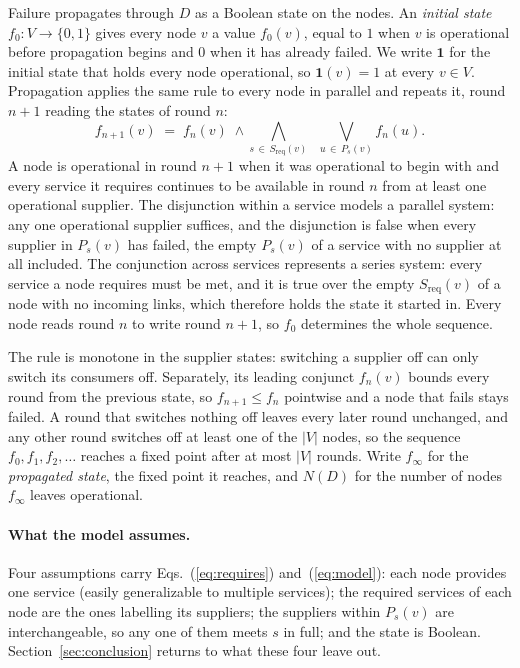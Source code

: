 \documentclass{svproc}
\begin{document}
Failure propagates through $D$ as a Boolean state on the nodes. An
\emph{initial state} $f_0 : V \to \{0,1\}$ gives every node $v$ a value $f_0(v)$,
equal to $1$ when $v$ is operational before propagation begins and $0$ when it has
already failed. We write $\mathbf{1}$ for the initial state that holds every node
operational, so $\mathbf{1}(v) = 1$ at every $v \in V$.
Propagation applies the same rule to every node in parallel and repeats it, round
$n+1$ reading the states of round $n$:
\begin{equation}
f_{n+1}(v) \;=\; f_n(v) \;\wedge \bigwedge_{s \,\in\, S_{\mathrm{req}}(v)} \;\;
          \bigvee_{u \,\in\, P_s(v)} f_n(u).
\label{eq:model}
\end{equation}
A node is operational in round $n+1$ when it was operational to begin with and
every service it requires continues to be available in round $n$ from at least one operational
supplier. The disjunction within a service models a parallel system: any one
operational supplier suffices, and the disjunction is false when every supplier in
$P_s(v)$ has failed, the empty $P_s(v)$ of a service with no supplier at all
included. The conjunction across services represents a series system: every service
a node requires must be met, and it is true over the empty $S_{\mathrm{req}}(v)$ of a
node with no incoming links, which therefore holds the state it started in. Every
node reads round $n$ to write round $n+1$, so $f_0$ determines the whole sequence.

The rule is monotone in the supplier states: switching a supplier off can only
switch its consumers off. Separately, its leading conjunct $f_n(v)$ bounds every
round from the previous state, so $f_{n+1} \le f_n$ pointwise and a node that fails
stays failed. A round that switches nothing off leaves every later round unchanged,
and any other round switches off at least one of the $|V|$ nodes, so the sequence
$f_0, f_1, f_2, \dots$ reaches a fixed point after at most $|V|$ rounds. Write
$f_\infty$ for the \emph{propagated state}, the fixed point it reaches, and $N(D)$ for the number of
nodes $f_\infty$ leaves operational.

\paragraph{What the model assumes.}
Four assumptions carry Eqs.~(\ref{eq:requires}) and~(\ref{eq:model}): each node
provides one service (easily generalizable to multiple services); 
the required services of each node are the ones labelling its suppliers; the suppliers
within $P_s(v)$ are interchangeable, so any one of them meets $s$ in full; and the
state is Boolean.
Section~\ref{sec:conclusion} returns to what these four leave out.
\end{document}

